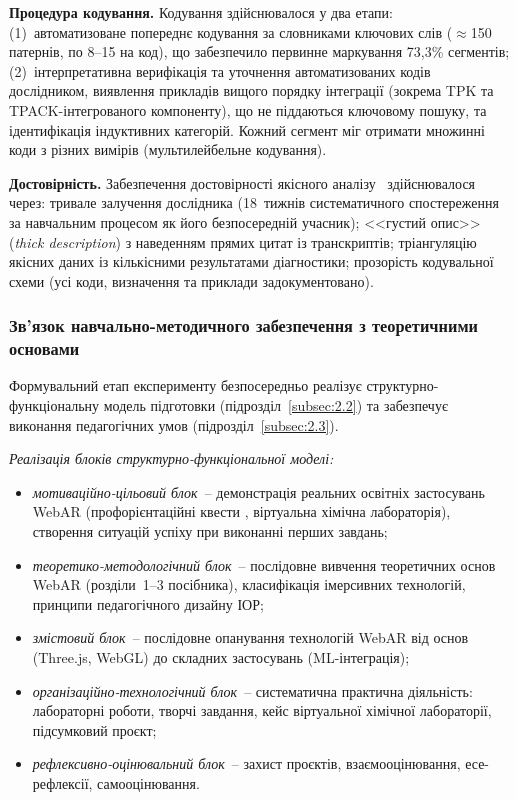 \textbf{Процедура кодування.} Кодування здійснювалося у два етапи: (1)~автоматизоване попереднє кодування за словниками ключових слів ($\approx$150 патернів, по 8--15 на код), що забезпечило первинне маркування 73{,}3\% сегментів; (2)~інтерпретативна верифікація та уточнення автоматизованих кодів дослідником, виявлення прикладів вищого порядку інтеграції (зокрема TPK та TPACK-інтегрованого компоненту), що не піддаються ключовому пошуку, та ідентифікація індуктивних категорій. Кожний сегмент міг отримати множинні коди з різних вимірів (мультилейбельне кодування).

\textbf{Достовірність.} Забезпечення достовірності якісного аналізу~\cite{Saldana2021Coding} здійснювалося через: тривале залучення дослідника (18~тижнів систематичного спостереження за навчальним процесом як його безпосередній учасник); <<густий опис>> (\textit{thick description}) з наведенням прямих цитат із транскриптів; тріангуляцію якісних даних із кількісними результатами діагностики; прозорість кодувальної схеми (усі коди, визначення та приклади задокументовано).

\subsubsection{Зв'язок навчально-методичного забезпечення з теоретичними основами}

Формувальний етап експерименту безпосередньо реалізує структурно-функціональну модель підготовки (підрозділ~\ref{subsec:2.2}) та забезпечує виконання педагогічних умов (підрозділ~\ref{subsec:2.3}).

\textit{Реалізація блоків структурно-функціональної моделі:}
\begin{itemize}
\item \textit{мотиваційно-цільовий блок}~-- демонстрація реальних освітніх застосувань WebAR (профорієнтаційні квести \cite{Shepiliev2021Career}, віртуальна хімічна лабораторія), створення ситуацій успіху при виконанні перших завдань;
\item \textit{теоретико-методологічний блок}~-- послідовне вивчення теоретичних основ WebAR (розділи~1--3 посібника), класифікація імерсивних технологій, принципи педагогічного дизайну ІОР;
\item \textit{змістовий блок}~-- послідовне опанування технологій WebAR від основ (Three.js, WebGL) до складних застосувань (ML-інтеграція);
\item \textit{організаційно-технологічний блок}~-- систематична практична діяльність: лабораторні роботи, творчі завдання, кейс віртуальної хімічної лабораторії, підсумковий проєкт;
\item \textit{рефлексивно-оцінювальний блок}~-- захист проєктів, взаємооцінювання, есе-рефлексії, самооцінювання.
\end{itemize}

